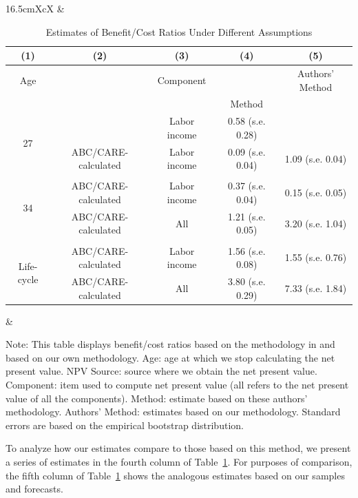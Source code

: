 \begin{table}[!htpb]
\begin{threeparttable}
\caption{Estimates of Benefit/Cost Ratios Under Different Assumptions}
\label{table:comparing}
\centering
\footnotesize
\begin{tabularx}{16.5cm}{XcX}
& \begin{tabular}{ccccc}
\toprule
(1) & (2) & (3) & (4) & (5)\\ \midrule
Age & \mc{1}{c}{NPV Source} & Component & \citet{Kline_Walters_2016_QJE} & Authors' Method \\
& & & Method & \\ \midrule
\multirow{2}{*}{27} & \cite{Chetty_Friedman_etal_2011_QJoE} & Labor income & 0.58 (s.e. 0.28) &  \\
& ABC/CARE-calculated & Labor income & 0.09 (s.e. 0.04) &  1.09 (s.e. 0.04)\\ \\
\multirow{2}{*}{34} & ABC/CARE-calculated & Labor income & 0.37 (s.e. 0.04) & 0.15 (s.e. 0.05) \\
& ABC/CARE-calculated & All & 1.21 (s.e. 0.05) &  3.20 (s.e. 1.04) \\ \\
\multirow{2}{*}{Life-cycle} &  ABC/CARE-calculated & Labor income & 1.56 (s.e. 0.08) & 1.55 (s.e. 0.76) \\
& ABC/CARE-calculated & All & 3.80 (s.e. 0.29) & 7.33 (s.e. 1.84) \\
\bottomrule
\end{tabular}
&
\end{tabularx}
\begin{tablenotes}
\footnotesize
\item Note: This table displays benefit/cost ratios based on the methodology in \citet{Kline_Walters_2016_QJE} and based on our own methodology. Age: age at which we stop calculating the net present value. NPV Source: source where we obtain the net present value. Component: item used to compute net present value (all refers to the net present value of all the components). \citet{Kline_Walters_2016_QJE} Method: estimate based on these authors' methodology. Authors' Method: estimates based on our methodology. Standard errors are based on the empirical bootstrap distribution.
\end{tablenotes}
\end{threeparttable}
\end{table}

To analyze how our estimates compare to those based on this method, we present a series of estimates in the fourth column of Table~\ref{table:comparing}. For purposes of comparison, the fifth column of Table~\ref{table:comparing} shows the analogous estimates based on our samples and forecasts.

